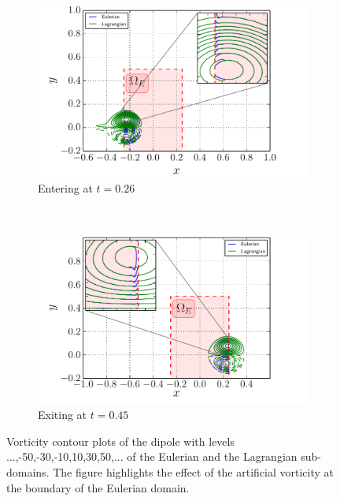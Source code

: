 	\begin{figure}[!p]
     \centering
     \begin{subfigure}[t]{0.48\textwidth}
             \includegraphics[width=\linewidth]{./figures/hybrid/cbConv/hybrid_doubleMonopoleConvection_entering2.pdf}
             \caption{Entering at $t=0.26$}
             \label{fig:hybrid_doubleMonopoleConvection_entering2}
     \end{subfigure}     
     ~ %
     \begin{subfigure}[t]{0.48\textwidth}
             \includegraphics[width=\linewidth]{./figures/hybrid/cbConv/hybrid_doubleMonopoleConvection_exiting.pdf}
             \caption{Exiting at $t=0.45$}
             \label{fig:hybrid_doubleMonopoleConvection_exiting}
     \end{subfigure}        
     
     \caption{Vorticity contour plots of the dipole with levels ...,-50,-30,-10,10,30,50,... of the Eulerian and the Lagrangian sub-domains. The figure highlights the effect of the artificial vorticity at the boundary of the Eulerian domain.}
     \label{fig:hybrid_doubleMonopoleConvection_ent_exi}
	\end{figure}
	
